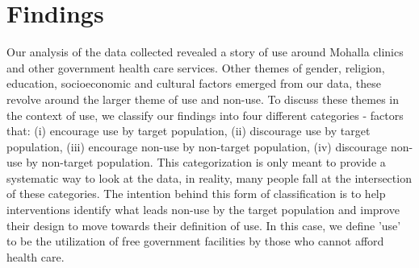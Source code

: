 \section{Findings}
\begin{comment}
This will form the chunk of your writing. I have sometimes iterated through these in written form, or else made a rough outline  on paper and then put it down. It is best that we talk about this section before you attempt to write. Depending on the structure of this section, you might label the section Findings or Analysis. The thing to remember is that all of your data goes into this section, and you need to weave a story around your data that is compelling, novel, and forms the central theme of the paper. If you have done qualitative work, make sure you include these quotes in the findings. Most importantly, do not tell a story based on quotes you have. Pick quotes based on the story you want to tell.
STORY OF USE
\end{comment}
\textcolor{red}{}
Our analysis of the data collected revealed a story of use around Mohalla clinics and other government health care services. Other themes of gender, religion, education, socioeconomic and cultural factors emerged from our data, these revolve around the larger theme of use and non-use. To discuss these themes in the context of use, we classify our findings into four different categories - factors that: (i) encourage use by target population, (ii) discourage use by target population, (iii) encourage non-use by non-target population, (iv) discourage non-use by non-target population. This categorization is only meant to provide a systematic way to look at the data, in reality, many people fall at the intersection of these categories. The intention behind this form of classification is to help interventions identify what leads non-use by the target population and improve their design to move towards their definition of use. In this case, we define 'use' to be the utilization of free government facilities by those who cannot afford health care.

